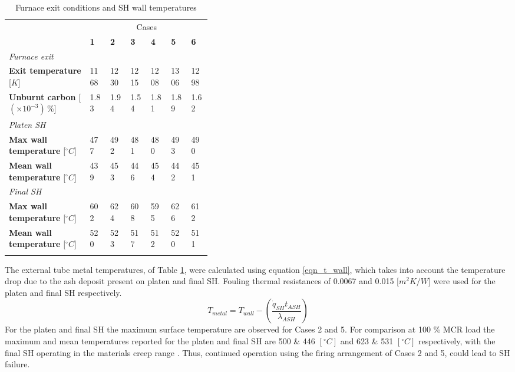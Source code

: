 \documentclass[review]{elsarticle}
\begin{document}
\begin{table}[h!]
\centering
\caption{Furnace exit conditions and SH wall temperatures}
\vspace{2mm}
{\tabulinesep=1.2mm
\begin{tabularx}{\linewidth}{p{0.4\linewidth} XXXXXX}
\hline
&\multicolumn{6}{c}{Cases}\\
 & \textbf{1} & \textbf{2} & \textbf{3}& \textbf{4}&\textbf{5}&\textbf{6}\\
\hline
\multicolumn{7}{l}{\textit{Furnace exit}}\\
\textbf{Exit temperature} [$K$] & 1168 & 1230 & 1215 & 1208 & 1306 & 1298\\
\textbf{Unburnt carbon} [$(\times 10^{-3})\,\%$] & 1.83 & 1.94 & 1.54 & 1.81 & 1.89 & 1.62\\
\multicolumn{7}{l}{\textit{Platen SH}}\\
\textbf{Max wall temperature} [$^{\circ}C$]  &477 & 492 & 481  & 480 & 493 & 490\\
\textbf{Mean wall temperature} [$^{\circ}C$] &439 & 453 & 446 & 454 & 442 & 451\\
\multicolumn{7}{l}{\textit{Final SH}}\\
\textbf{Max wall temperature} [$^{\circ}C$]  & 602 & 624 & 608 & 595 & 626 & 612\\
\textbf{Mean wall temperature} [$^{\circ}C$] & 520 & 523 & 517 & 512 & 520 & 511\\
\hline
\label{tbl_cfd_results}
\end{tabularx}}
\end{table}
The external tube metal temperatures, of Table \ref{tbl_cfd_results}, were calculated using equation \ref{eqn_t_wall}, which takes into account the temperature drop due to the ash deposit present on platen and final SH. Fouling thermal resistances of 0.0067 and 0.015 [$m^2K/W$] were used for the platen and final SH respectively.  
\begin{equation}\label{eqn_t_wall}
T_{metal} = T_{wall} - \left(\frac{\dot{q}_{SH}t_{ASH}}{\lambda_{ASH}}\right)
\end{equation}
For the platen and final SH the maximum surface temperature are observed for Cases 2 and 5. For comparison at 100 \% MCR load the maximum and mean temperatures reported for the platen and final SH are 500 \& 446 $[^\circ C]$ and 623 \& 531 $[^\circ C]$ respectively, with the final SH operating in the materials creep range \cite{Laubscher2019b}. Thus, continued operation using the firing arrangement of Cases 2 and 5, could lead to SH failure.
\end{document}

